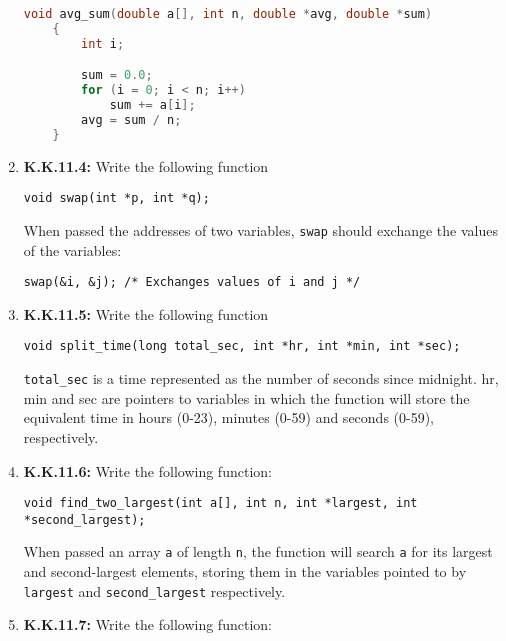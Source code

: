 \documentclass[12pt]{article}
\begin{document}
\begin{enumerate}[1.]
\begin{lstlisting}[language=c]
    void avg_sum(double a[], int n, double *avg, double *sum)
    {
        int i;

        sum = 0.0;
        for (i = 0; i < n; i++)
            sum += a[i];
        avg = sum / n;
    }
\end{lstlisting}

    \item \textbf{K.K.11.4:} Write the following function

    \bigskip

    \texttt{void swap(int *p, int *q);}

    \bigskip

    When passed the addresses of two variables, \texttt{swap} should exchange the values of the variables:

    \bigskip

    \texttt{swap(\&i, \&j); /* Exchanges values of i and j */}

    \bigskip

    \item \textbf{K.K.11.5:} Write the following function

    \bigskip

    \texttt{void split\_time(long total\_sec, int *hr, int *min, int *sec);}

    \bigskip

    \texttt{total\_sec} is a time represented as the number of seconds since midnight.
    hr, min and sec are pointers to variables in which the function will store the
    equivalent time in hours (0-23), minutes (0-59) and seconds (0-59), respectively.

    \bigskip

    \item \textbf{K.K.11.6:} Write the following function:


    \bigskip

    \texttt{void find\_two\_largest(int a[], int n, int *largest, int *second\_largest);}

    \bigskip

    When passed an array \texttt{a} of length \texttt{n}, the function will search
    \texttt{a} for its largest and second-largest elements, storing them in the
    variables pointed to by \texttt{largest} and \texttt{second\_largest} respectively.


    \item \textbf{K.K.11.7:} Write the following function:


\end{enumerate}
\end{document}
